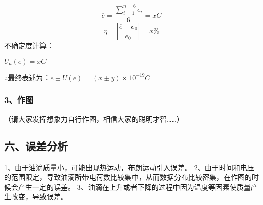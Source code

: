 \documentclass[11pt,a4paper,oneside]{article}
\begin{document}
\begin{CJK*}{GBK}{song}
 $$\overline{e}=\frac{\sum_{i=1}^{n=6}e_i}{6}=xC$$
 $$\eta=|\frac{\overline{e}-e_0}{e_0}|=x\%$$
 不确定度计算：
 \par $U_a(e)=xC$
 \par
$\therefore $最终表述为：$e\pm U(e)=(x\pm y)\times 10^{-19}C$

\subsubsection*{3、作图} %
（请大家发挥想象力自行作图，相信大家的聪明才智……）
\subsection*{六、误差分析}
1、由于油滴质量小，可能出现热运动，布朗运动引入误差。
2、由于时间和电压的范围限定，导致油滴所带电荷数比较集中，从而数据分布比较密集，在作图的时候会产生一定的误差。
3、油滴在上升或者下降的过程中因为温度等因素使质量产生改变，导致误差。


\end{CJK*}
\end{document}
